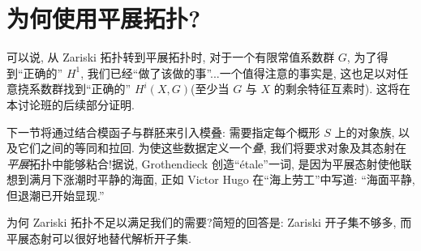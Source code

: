 \section{为何使用平展拓扑?}\label{src:1.5}
\begin{epigraph}
可以说, 从 Zariski 拓扑转到平展拓扑时, 对于一个有限常值系数群 $G$, 为了得到``正确的'' $H^1$, 我们已经``做了该做的事''...一个值得注意的事实是, 这也足以对任意挠系数群找到``正确的'' $H^i(X,G)$(至少当 $G$ 与 $X$ 的剩余特征互素时). 这将在本讨论班的后续部分证明.
\end{epigraph}
下一节将通过结合模函子与群胚来引入模叠: 需要指定每个概形 $S$ 上的对象族, 以及它们之间的等同和拉回. 为使这些数据定义一个\textit{叠}, 我们将要求对象及其态射在\textit{平展}拓扑中能够粘合!据说, Grothendieck 创造``étale''一词, 是因为平展态射使他联想到满月下涨潮时平静的海面, 正如 Victor Hugo 在``海上劳工''中写道: ``海面平静, 但退潮已开始显现.''

为何 Zariski 拓扑不足以满足我们的需要?简短的回答是: Zariski 开子集不够多, 而平展态射可以很好地替代解析开子集.

